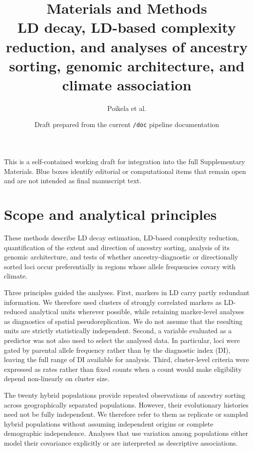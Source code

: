 \documentclass[11pt]{article}
\title{\vspace{-3em}
  \textbf{\color{Accent}Materials and Methods}\\[0.3em]
  \Large LD decay, LD-based complexity reduction, and analyses of ancestry
  sorting, genomic architecture, and climate association}
\author{Poikela et al.}
\date{\small Draft prepared from the current \texttt{/doc} pipeline documentation}
\begin{document}
\maketitle
\vspace{-1.5em}

\begin{center}
\small\color{Muted}
This is a self-contained working draft for integration into the full
Supplementary Materials. Blue boxes identify editorial or computational items
that remain open and are not intended as final manuscript text.
\end{center}

\section{Scope and analytical principles}

These methods describe LD decay estimation, LD-based complexity reduction,
quantification of the extent and direction of ancestry sorting, analysis of its
genomic architecture, and tests of whether ancestry-diagnostic or directionally
sorted loci occur preferentially in regions whose allele frequencies covary
with climate.

Three principles guided the analyses. First, markers in LD carry partly
redundant information. We therefore used clusters of strongly correlated
markers as LD-reduced analytical units wherever possible, while retaining
marker-level analyses as diagnostics of spatial pseudoreplication. We do not
assume that the resulting units are strictly statistically independent.
Second, a variable evaluated as a predictor was not also used to select the
analysed data. In particular, loci were gated by parental allele frequency
rather than by the diagnostic index (DI), leaving the full range of DI
available for analysis. Third, cluster-level criteria were expressed as rates
rather than fixed counts when a count would make eligibility depend
non-linearly on cluster size.

The twenty hybrid populations provide repeated observations of ancestry
sorting across geographically separated populations. However, their
evolutionary histories need not be fully independent. We therefore refer to
them as replicate or sampled hybrid populations without assuming independent
origins or complete demographic independence. Analyses that use variation
among populations either model their covariance explicitly or are interpreted
as descriptive associations.
\end{document}
